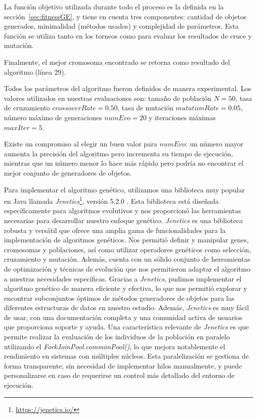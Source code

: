 La función objetivo utilizada durante todo el proceso es la definida en la sección~\ref{sec:fitnessGE}, y tiene en cuenta tres componentes: cantidad de objetos generados, minimalidad (métodos usados) y complejidad de parámetros. 
Esta función se utiliza tanto en los torneos como para evaluar los resultados de cruce y mutación.

Finalmente, el mejor cromosoma encontrado se retorna como resultado del algoritmo (línea 29).

Todos los parámetros del algoritmo fueron definidos de manera experimental.
Los valores utilizados en nuestras evaluaciones son: tamaño de población $N = 50$, tasa de cruzamiento $crossoverRate = 0.50$, tasa de mutación $mutationRate = 0.05$, número máximo de generaciones $numEvo = 20$ y iteraciones máximas $maxIter = 5$.
 
Existe un compromiso al elegir un buen valor para $numEvo$: un número mayor aumenta la precisión del algoritmo pero incrementa su tiempo de ejecución, 
mientras que un número menor lo hace más rápido pero podría no encontrar el
mejor conjunto de generadores de objetos.

Para implementar el algoritmo genético, utilizamos una biblioteca muy popular en Java llamada \emph{Jenetics}\footnote{\url{https://jenetics.io/}}, versión 5.2.0 . Esta biblioteca está diseñada específicamente para algoritmos evolutivos y nos proporcionó las herramientas necesarias para desarrollar nuestro enfoque genético.
\emph{Jenetics} es una biblioteca robusta y versátil que ofrece una amplia gama de funcionalidades para la implementación de algoritmos genéticos. Nos permitió definir y manipular genes, cromosomas y poblaciones, así como utilizar operadores genéticos como selección, cruzamiento y mutación. Además, cuenta con un sólido conjunto de herramientas de optimización y técnicas de evolución que nos permitieron adaptar el algoritmo a nuestras necesidades específicas.
Gracias a \emph{Jenetics}, pudimos implementar el algoritmo genético de manera eficiente y efectiva, lo que nos permitió explorar y encontrar subconjuntos óptimos de métodos generadores de objetos para las diferentes estructuras de datos en nuestro estudio. Además, \emph{Jenetics} es muy fácil de usar, con una documentación completa y una comunidad activa de usuarios que proporciona soporte y ayuda.
Una característica relevante de \emph{Jenetics} es que permite realizar la evaluación de los individuos de la población en paralelo utilizando el \emph{ForkJoinPool.commonPool()}, lo que mejora notablemente el rendimiento en sistemas con múltiples núcleos. Esta paralelización se gestiona de forma transparente, sin necesidad de implementar hilos manualmente, y puede personalizarse en caso de requerirse un control más detallado del entorno de ejecución.


